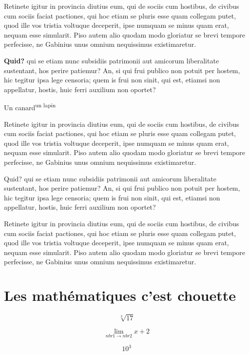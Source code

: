 \documentclass{report}
\begin{document}
Retinete igitur in provincia diutius eum, qui de sociis
cum hostibus, de civibus cum sociis faciat pactiones, qui hoc etiam se pluris esse
quam collegam putet, quod ille vos tristia voltuque deceperit, ipse numquam se minus
quam erat, nequam esse simularit. Piso autem alio quodam modo gloriatur se brevi
tempore perfecisse,
ne Gabinius unus omnium nequissimus existimaretur.


\textbf{Quid?} 
qui se etiam nunc subsidiis patrimonii aut amicorum liberalitate sustentant,
hos perire patiemur? An, si qui frui publico non potuit per hostem, hic tegitur ipsa
lege censoria; quem is frui non sinit, qui est, etiamsi non appellatur, hostis, huic
ferri auxilium non oportet?


{\LARGE Un canard\textsuperscript{un lapin} }


Retinete igitur in provincia diutius eum, qui de sociis
cum hostibus, de civibus cum sociis faciat pactiones, qui hoc etiam se pluris esse
quam collegam putet, quod ille vos tristia voltuque deceperit, ipse numquam se minus
quam erat, nequam esse simularit. Piso autem alio quodam modo gloriatur se brevi
tempore perfecisse,
ne Gabinius unus omnium nequissimus existimaretur.

Quid? qui se etiam nunc subsidiis patrimonii aut amicorum liberalitate sustentant,
hos perire patiemur? An, si qui frui publico non potuit per hostem, hic tegitur ipsa
lege censoria; quem is frui non sinit, qui est, etiamsi non appellatur, hostis, huic
ferri auxilium non oportet?

Retinete igitur in provincia diutius eum, qui de sociis
cum hostibus, de civibus cum sociis faciat pactiones, qui hoc etiam se pluris esse
quam collegam putet, quod ille vos tristia voltuque deceperit, ipse numquam se minus
quam erat, nequam esse simularit. Piso autem alio quodam modo gloriatur se brevi
tempore perfecisse,
ne Gabinius unus omnium nequissimus existimaretur.

\section{Les mathématiques c'est chouette}

\[\sqrt[3]{17}\]

\begin{equation}
 \lim_{nbr1 \to nbr2} x+2
\end{equation}

\begin{equation}
 10^{3}
\end{equation}
\end{document}
